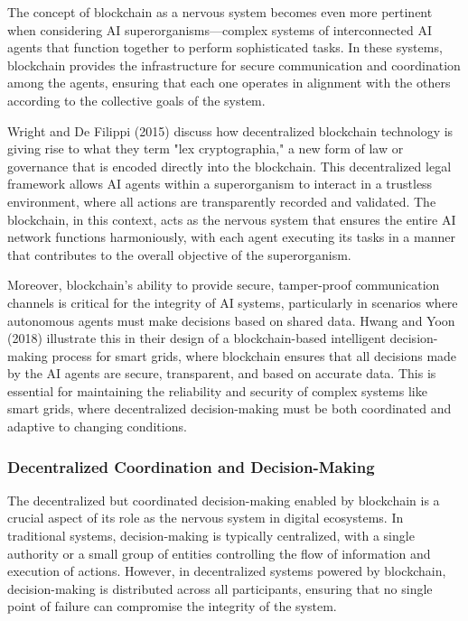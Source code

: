 \documentclass[12pt,twoside]{article}
\begin{document}
The concept of blockchain as a nervous system becomes even more pertinent when considering AI superorganisms—complex systems of interconnected AI agents that function together to perform sophisticated tasks. In these systems, blockchain provides the infrastructure for secure communication and coordination among the agents, ensuring that each one operates in alignment with the others according to the collective goals of the system.

Wright and De Filippi (2015) discuss how decentralized blockchain technology is giving rise to what they term "lex cryptographia," a new form of law or governance that is encoded directly into the blockchain. This decentralized legal framework allows AI agents within a superorganism to interact in a trustless environment, where all actions are transparently recorded and validated. The blockchain, in this context, acts as the nervous system that ensures the entire AI network functions harmoniously, with each agent executing its tasks in a manner that contributes to the overall objective of the superorganism.

Moreover, blockchain’s ability to provide secure, tamper-proof communication channels is critical for the integrity of AI systems, particularly in scenarios where autonomous agents must make decisions based on shared data. Hwang and Yoon (2018) illustrate this in their design of a blockchain-based intelligent decision-making process for smart grids, where blockchain ensures that all decisions made by the AI agents are secure, transparent, and based on accurate data. This is essential for maintaining the reliability and security of complex systems like smart grids, where decentralized decision-making must be both coordinated and adaptive to changing conditions.

\subsubsection{Decentralized Coordination and Decision-Making}

The decentralized but coordinated decision-making enabled by blockchain is a crucial aspect of its role as the nervous system in digital ecosystems. In traditional systems, decision-making is typically centralized, with a single authority or a small group of entities controlling the flow of information and execution of actions. However, in decentralized systems powered by blockchain, decision-making is distributed across all participants, ensuring that no single point of failure can compromise the integrity of the system.
\end{document}
